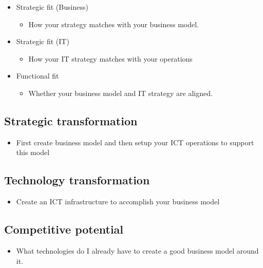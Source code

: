 \documentclass{article}
\begin{document}
\begin{itemize}
\item  Strategic fit (Business)

\begin{itemize}
\item  How your strategy matches with your business model.
\end{itemize}

\item  Strategic fit (IT)

\begin{itemize}
\item  How your IT strategy matches with your operations
\end{itemize}

\item  Functional fit

\begin{itemize}
\item  Whether your business model and IT strategy are aligned.
\end{itemize}
\end{itemize}

\subsection{Strategic transformation}

\begin{itemize}
\item  First create business model and then setup your ICT operations to support this model
\end{itemize}

\subsection{Technology transformation}

\begin{itemize}
\item  Create an ICT infrastructure to accomplish your business model
\end{itemize}

\subsection{Competitive potential}

\begin{itemize}
\item  What technologies do I already have to create a good business model around it.
\end{itemize}
\end{document}
